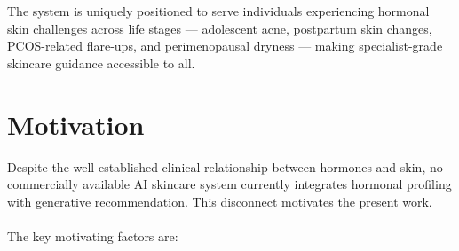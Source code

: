 \hspace*{0.5in}The system is uniquely positioned to serve individuals experiencing hormonal skin challenges across life stages — adolescent acne, postpartum skin changes, PCOS-related flare-ups, and perimenopausal dryness — making specialist-grade skincare guidance accessible to all.\\

\section{Motivation}
\hspace*{0.5in}Despite the well-established clinical relationship between hormones and skin, no commercially available AI skincare system currently integrates hormonal profiling with generative recommendation. This disconnect motivates the present work.\\\\
The key motivating factors are:
